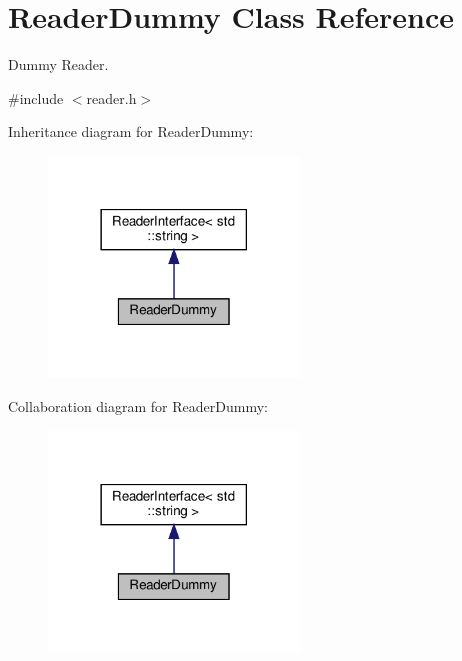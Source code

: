\hypertarget{classReaderDummy}{}\section{Reader\+Dummy Class Reference}
\label{classReaderDummy}


Dummy Reader.  




{\ttfamily \#include $<$reader.\+h$>$}



Inheritance diagram for Reader\+Dummy\+:
\nopagebreak
\begin{figure}[H]
\begin{center}
\leavevmode
\includegraphics[width=189pt]{classReaderDummy__inherit__graph}
\end{center}
\end{figure}


Collaboration diagram for Reader\+Dummy\+:
\nopagebreak
\begin{figure}[H]
\begin{center}
\leavevmode
\includegraphics[width=189pt]{classReaderDummy__coll__graph}
\end{center}
\end{figure}
